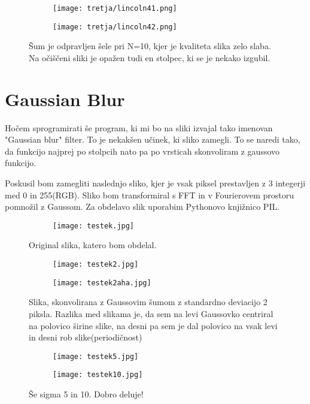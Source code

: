\documentclass{article}
\begin{document}
\begin{figure}[H]
\centering
\begin{subfigure}{.9\textwidth}
\texttt{[image: tretja/lincoln41.png]}
\end{subfigure}
\begin{subfigure}{.9\textwidth}
\texttt{[image: tretja/lincoln42.png]}
\end{subfigure}
\caption*{Šum je odpravljen šele pri N=10, kjer je kvaliteta slika zelo slaba. Na očiščeni sliki je opažen tudi en stolpec, ki se je nekako izgubil.}
\end{figure}

\section{Gaussian Blur}
Hočem sprogramirati še program, ki mi bo na sliki izvajal tako imenovan "Gaussian blur" filter. To je nekakšen učinek, ki sliko zamegli.
To se naredi tako, da funkcijo najprej po stolpcih nato pa po vrsticah skonvoliram z gaussovo funkcijo.

Poskusil bom zamegliti naslednjo sliko, kjer je vsak piksel prestavljen z 3 integerji med 0 in 255(RGB). Sliko bom transformiral s FFT in v Fourierovem prostoru pomnožil z Gaussom. Za obdelavo slik uporabim Pythonovo knjižnico PIL.


\begin{figure}[H]
\centering
\begin{subfigure}{.7\textwidth}
\texttt{[image: testek.jpg]}
\end{subfigure}
\caption*{Original slika, katero bom obdelal.}
\end{figure}

\begin{figure}[H]
\centering
\begin{subfigure}{.49\textwidth}
\texttt{[image: testek2.jpg]}
\end{subfigure}
\begin{subfigure}{.49\textwidth}
\texttt{[image: testek2aha.jpg]}
\end{subfigure}
\caption*{Slika, skonvolirana z Gaussovim šumom z standardno deviacijo 2 piksla. Razlika med slikama je, da sem na levi Gaussovko centriral na polovico širine slike, na desni pa sem je dal polovico na vsak levi in desni rob slike(periodičnost)}
\end{figure}

\begin{figure}[H]
\centering
\begin{subfigure}{.49\textwidth}
\texttt{[image: testek5.jpg]}
\end{subfigure}
\begin{subfigure}{.49\textwidth}
\texttt{[image: testek10.jpg]}
\end{subfigure}
\caption*{Še sigma 5 in 10. Dobro deluje!}
\end{figure}
\end{document}
